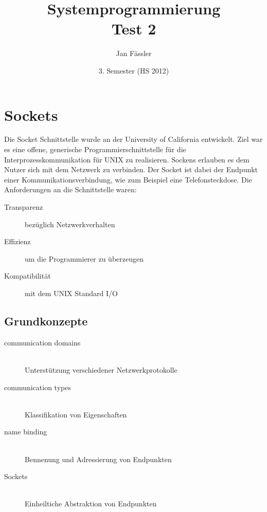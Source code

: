 \documentclass[10pt]{article}
\title{
	\vspace{5cm}
	Systemprogrammierung \\
	Test 2
}
\author{Jan Fässler}
\date{3. Semester (HS 2012)}
\begin{document}
\maketitle
\thispagestyle{fancy}

\newpage

\tableofcontents	  	


\newpage
\setcounter{page}{1}


\section{Sockets}
Die Socket Schnittstelle wurde an der University of California entwickelt. Ziel war es eine offene, generische Programmierschnittstelle für die Interprozesskommunikation für UNIX zu realisieren. Sockens erlauben es dem Nutzer sich mit dem Netzwerk zu verbinden. Der Socket ist dabei der Endpunkt einer Kommunikationsverbindung, wie zum Beispiel eine Telefonsteckdose. Die Anforderungen an die Schnittstelle waren:
\begin{description}
	\item[Transparenz] bezüglich Netzwerkverhalten
	\item[Effizienz] um die Programmierer zu überzeugen
	\item[Kompatibilität] mit dem UNIX Standard I/O
\end{description}

\subsection{Grundkonzepte}
\begin{description}
	\item[communication domains] \hfill \\ Unterstützung verschiedener Netzwerkprotokolle
	\item[communication types] \hfill \\ Klassifikation von Eigenschaften
	\item[name binding] \hfill \\ Bennenung und Adressierung von Endpunkten
	\item[Sockets] \hfill \\ Einheiltiche Abstraktion von Endpunkten
\end{description}
\end{document}
